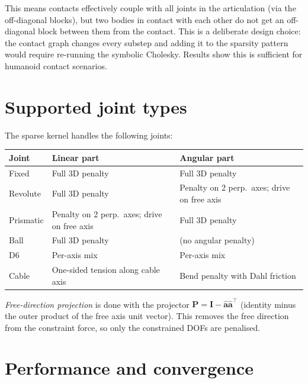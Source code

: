 \documentclass[11pt,a4paper]{article}
\begin{document}
This means contacts effectively couple with all joints in the articulation
(via the off-diagonal blocks), but two bodies in contact with each other do
not get an off-diagonal block between them from the contact.  This is a
deliberate design choice: the contact graph changes every substep and adding
it to the sparsity pattern would require re-running the symbolic Cholesky.
Results show this is sufficient for humanoid contact scenarios.

\section{Supported joint types}

The sparse kernel handles the following joints:

\begin{center}
\begin{tabular}{lp{4.5cm}p{4.5cm}}
\toprule
Joint & Linear part & Angular part \\
\midrule
Fixed      & Full 3D penalty & Full 3D penalty \\
Revolute   & Full 3D penalty & Penalty on 2 perp.\ axes; drive on free axis \\
Prismatic  & Penalty on 2 perp.\ axes; drive on free axis & Full 3D penalty \\
Ball       & Full 3D penalty & (no angular penalty) \\
D6         & Per-axis mix & Per-axis mix \\
Cable      & One-sided tension along cable axis & Bend penalty with Dahl friction \\
\bottomrule
\end{tabular}
\end{center}

\emph{Free-direction projection} is done with the projector
$\mathbf{P} = \mathbf{I} - \hat{\mathbf{a}}\hat{\mathbf{a}}^\top$ (identity
minus the outer product of the free axis unit vector).  This removes the free
direction from the constraint force, so only the constrained DOFs are penalised.

\section{Performance and convergence}
\end{document}
